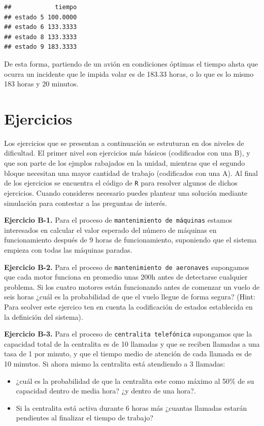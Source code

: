 \documentclass[
]{book}
\providecommand{\tightlist}{%
  \setlength{\itemsep}{0pt}\setlength{\parskip}{0pt}}
\theoremstyle{definition}
\theoremstyle{definition}
\theoremstyle{definition}
\theoremstyle{definition}
\theoremstyle{remark}
\begin{document}
\begin{verbatim}
##            tiempo
## estado 5 100.0000
## estado 6 133.3333
## estado 8 133.3333
## estado 9 183.3333
\end{verbatim}

De esta forma, partiendo de un avión en condiciones óptimas el tiempo ahsta que ocurra un incidente que le impida volar es de 183.33 horas, o lo que es lo mismo 183 horas y 20 minutos.

\hypertarget{CMTCK}{%
\section{Ejercicios}\label{CMTCK}}

Los ejercicios que se presentan a continuación se estruturan en dos niveles de dificultad. El primer nivel son ejercicios más básicos (codificados con una B), y que son parte de los ejmplos rabajados en la unidad, mientras que el segundo bloque necesitan una mayor cantidad de trabajo (codificados con una A). Al final de los ejercicios se encuentra el código de \texttt{R} para resolver algunos de dichos ejercicios. Cuando consideres necesario puedes plantear una solución mediante simulación para contestar a las preguntas de interés.

\textbf{Ejercicio B-1.} Para el proceso de \texttt{mantenimiento\ de\ máquinas} estamos interesados en calcular el valor esperado del número de máquinas en funcionamiento después de 9 horas de funcionamiento, suponiendo que el sistema empieza con todas las máquinas paradas.

\textbf{Ejercicio B-2.} Para el proceso de \texttt{mantenimiento\ de\ aeronaves} supongamos que cada motor funciona en promedio unas 200h antes de detectarse cualquier problema. Si los cuatro motores están funcionando antes de comenzar un vuelo de seis horas ¿cuál es la probabilidad de que el vuelo llegue de forma segura? (Hint: Para seolver este ejercico ten en cuenta la codificación de estados establecida en la definición del sistema).

\textbf{Ejercicio B-3.} Para el proceso de \texttt{centralita\ telefónica} supongamos que la capacidad total de la centralita es de 10 llamadas y que se reciben llamadas a una tasa de 1 por minuto, y que el tiempo medio de atención de cada llamada es de 10 minutos. Si ahora mismo la centralita está atendiendo a 3 llamadas:

\begin{itemize}
\tightlist
\item
  ¿cuál es la probabilidad de que la centralita este como máximo al 50\% de su capacidad dentro de media hora? ¿y dentro de una hora?.
\item
  Si la centralita está activa durante 6 horas más ¿cuantas llamadas estarán pendientes al finalizar el tiempo de trabajo?
\end{itemize}
\end{document}
